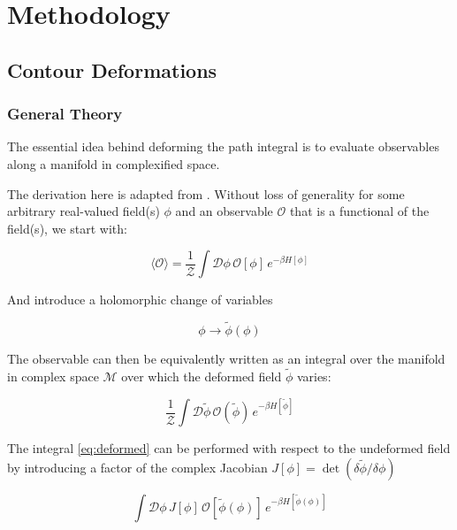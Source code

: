 \documentclass[12pt]{article}
\begin{document}
\section{Methodology}

\subsection{Contour Deformations}

\subsubsection{General Theory}

The essential idea behind deforming the path integral is to evaluate observables along a manifold in complexified space. 

The derivation here is adapted from \cite{Detmold_2021}. Without loss of generality
for some arbitrary real-valued field(s) $\phi$ and an observable $\mathcal{O}$ that is a functional of the field(s), we start with:

\begin{equation} \label{eq:undeformed}
	\langle \mathcal{O} \rangle = \frac{1}{\mathcal{Z}} \int \mathcal{D}\phi \, \mathcal{O}[\phi] \, e^{-\beta H[\phi]}
\end{equation}

And introduce a holomorphic change of variables 

\begin{equation*}
	\phi \rightarrow \tilde{\phi}(\phi)
\end{equation*}

The observable can then be equivalently written as an integral over the manifold in complex space $\mathcal{M}$ 
over which the deformed field $\tilde{\phi}$ varies:

\begin{equation} \label{eq:deformed}
	\frac{1}{\mathcal{Z}} \int \mathcal{D}\tilde{\phi} \, \mathcal{O}(\tilde{\phi}) \, e^{-\beta H[\tilde{\phi}]}
\end{equation}

The integral \ref{eq:deformed} can be performed with respect to the undeformed field by introducing a factor of the complex 
Jacobian $J[\phi] = \det \left( \delta \tilde{\phi} / \delta \phi \right)$

\begin{equation*}
	\int \mathcal{D}\phi \, J[\phi] \, \mathcal{O}[\tilde{\phi}(\phi)] \, e^{-\beta H[\tilde{\phi}(\phi)]}
\end{equation*}
\end{document}
